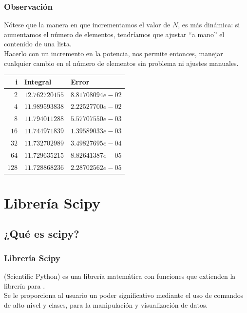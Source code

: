 \begin{frame}
\frametitle{Observación}
Nótese que la manera en que incrementamos el valor de $N$, es más dinámica: si aumentamos el número de elementos, tendríamos que ajustar \enquote{a mano} el contenido de una lista.
\\
\bigskip
Hacerlo con un incremento en la potencia, nos permite entonces, manejar cualquier cambio en el número de elementos sin problema ni ajustes manuales.
\end{frame}
\begin{frame}
\begin{center}
	\begin{tabular}{r | l | l} 
		i & Integral & Error \\ \hline
		$2$ & $12.762720155$ & $8.81708094e-02$ \\ \hline
		$4$ & $11.989593838$ & $2.22527700e-02$ \\ \hline
		$8$ & $11.794011288$ & $5.57707550e-03$ \\ \hline
		$16$ & $11.744971839$ & $1.39589033e-03$ \\ \hline
		$32$ & $11.732702989$ & $3.49827695e-04$ \\ \hline
		$64$ & $11.729635215$ & $8.82641387e-05$ \\ \hline
		$128$ & $11.728868236$ & $2.28702562e-05$
	\end{tabular}
\end{center}
\end{frame}
\section{Librería Scipy}
\subsection{¿Qué es scipy?}
\begin{frame}
\frametitle{Librería Scipy}
 (Scientific Python) es una librería matemática con funciones que extienden la librería  para \python.
\\
\bigskip
Se le proporciona al usuario un poder significativo mediante el uso de comandos de alto nivel y clases, para la manipulación y visualización de datos.
\end{frame}
